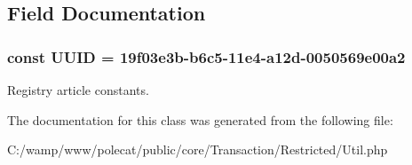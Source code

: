 \subsection{Field Documentation}
\hypertarget{class_able_polecat___transaction___restricted___util_a74b892c8c0b86bf9d04c5819898c51e7}{}
\subsubsection[{U\+U\+I\+D}]{\setlength{\rightskip}{0pt plus 5cm}const U\+U\+I\+D = \textquotesingle{}19f03e3b-\/b6c5-\/11e4-\/a12d-\/0050569e00a2\textquotesingle{}}\label{class_able_polecat___transaction___restricted___util_a74b892c8c0b86bf9d04c5819898c51e7}
Registry article constants. 

The documentation for this class was generated from the following file\+:\begin{DoxyCompactItemize}
\item 
C\+:/wamp/www/polecat/public/core/\+Transaction/\+Restricted/Util.\+php\end{DoxyCompactItemize}
